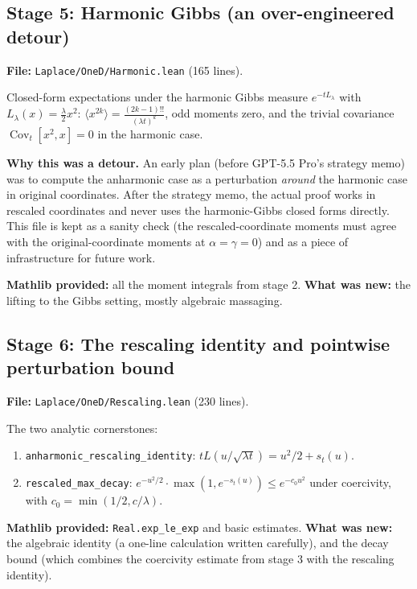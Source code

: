 \documentclass[11pt]{article}
\begin{document}
\subsection{Stage 5: Harmonic Gibbs (an over-engineered detour)}\label{sec:harmonic}

\textbf{File:} \texttt{Laplace/OneD/Harmonic.lean} (165 lines).

Closed-form expectations under the harmonic Gibbs measure $e^{-tL_\lambda}$
with $L_\lambda(x) = \tfrac\lambda2 x^2$:
$\langle x^{2k}\rangle = \tfrac{(2k-1)!!}{(\lambda t)^k}$, odd moments
zero, and the trivial covariance $\operatorname{Cov}_t[x^2, x] = 0$ in the
harmonic case.

\textbf{Why this was a detour.} An early plan (before GPT-5.5 Pro's
strategy memo) was to compute the anharmonic case as a perturbation
\emph{around} the harmonic case in original coordinates. After the
strategy memo, the actual proof works in rescaled coordinates and never
uses the harmonic-Gibbs closed forms directly. This file is kept as a
sanity check (the rescaled-coordinate moments must agree with the
original-coordinate moments at $\alpha = \gamma = 0$) and as a piece of
infrastructure for future work.

\textbf{Mathlib provided:} all the moment integrals from stage 2.
\textbf{What was new:} the lifting to the Gibbs setting, mostly algebraic
massaging.

\subsection{Stage 6: The rescaling identity and pointwise perturbation bound}

\textbf{File:} \texttt{Laplace/OneD/Rescaling.lean} (230 lines).

The two analytic cornerstones:
\begin{enumerate}
\item \texttt{anharmonic\_rescaling\_identity}:
$tL(u/\sqrt{\lambda t}) = u^2/2 + s_t(u)$.
\item \texttt{rescaled\_max\_decay}:
$e^{-u^2/2}\cdot\max(1, e^{-s_t(u)}) \le e^{-c_0 u^2}$
under coercivity, with $c_0 = \min(1/2, c/\lambda)$.
\end{enumerate}

\textbf{Mathlib provided:} \texttt{Real.exp\_le\_exp} and basic estimates.
\textbf{What was new:} the algebraic identity (a one-line calculation
written carefully), and the decay bound (which combines the coercivity
estimate from stage 3 with the rescaling identity).
\end{document}
